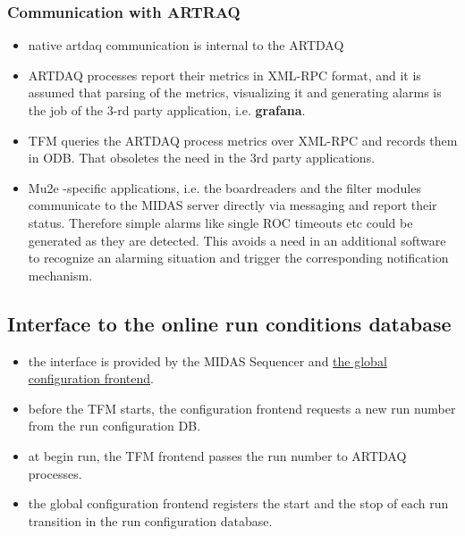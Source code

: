 \subsubsection{Communication with ARTRAQ}

\begin{itemize}
\item
  native artdaq communication is internal to the ARTDAQ
\item
  ARTDAQ processes report their metrics in XML-RPC format,
  and it is assumed that parsing of the metrics, visualizing
  it and generating alarms is the job of the 3-rd party application,
  i.e. {\bf grafana}.
\item
  TFM queries the ARTDAQ process metrics over XML-RPC and records
  them in ODB. That obsoletes the need in the 3rd party applications.
\item
  Mu2e -specific applications, i.e. the boardreaders and the filter modules 
  communicate to the MIDAS server directly via messaging and report 
  their status. Therefore simple alarms like single ROC timeouts etc
  could be generated as they are detected. 
  This avoids a need in an additional software to recognize an alarming
  situation and trigger the corresponding notification mechanism.
\end{itemize}


\subsection{Interface to the online run conditions database} 

\begin{itemize}
\item
  the interface is provided by the MIDAS Sequencer and 
  \href{https://github.com/pavel1murat/frontends/blob/main/conf/mu2e_config_fe.py}
  {\blue the global configuration frontend}.
\item
  before the TFM starts, the configuration frontend requests a new run 
  number from the run configuration DB.
\item
  at begin run, the TFM frontend passes the run number to ARTDAQ processes.
\item
  the global configuration frontend registers the start and the stop of each
  run transition in the run configuration database.
\end{itemize}


